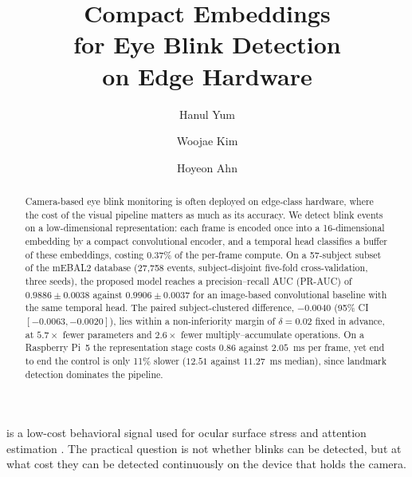 \documentclass{IEEEmce}
\begin{document}

\title{Compact Embeddings\\
for Eye Blink Detection\\
on Edge Hardware}

\author{Hanul Yum}

\author{Woojae Kim}

\author{Hoyeon Ahn}


\begin{abstract}Camera-based eye blink monitoring is often deployed on edge-class hardware, where the
cost of the visual pipeline matters as much as its accuracy. We detect blink events on a
low-dimensional representation: each frame is encoded once into a 16-dimensional
embedding by a compact convolutional encoder, and a
temporal head classifies a buffer of these embeddings,
costing 0.37\% of the per-frame compute. On a 57-subject subset of the mEBAL2 database
(27{,}758 events, subject-disjoint five-fold cross-validation, three seeds), the
proposed model reaches a precision--recall AUC (PR-AUC) of $0.9886 \pm 0.0038$ against
$0.9906 \pm 0.0037$ for an image-based convolutional baseline with the same temporal
head. The paired subject-clustered difference, $-0.0040$ (95\% CI $[-0.0063,-0.0020]$),
lies within a non-inferiority margin of $\delta = 0.02$ fixed in advance, at $5.7\times$
fewer parameters and $2.6\times$ fewer multiply--accumulate operations. On a Raspberry
Pi~5 the representation stage costs $0.86$ against $2.05$~ms per frame, yet end to end
the control is only 11\% slower ($12.51$ against $11.27$~ms median), since landmark
detection dominates the pipeline.
\end{abstract}


\maketitle
\enlargethispage{10pt}

 is a low-cost behavioral signal used for ocular surface stress
and attention estimation \cite{rosenfield2011,daza2020}. The practical question is not
whether blinks can be detected, but at what cost they can be detected continuously on
the device that holds the camera.
\end{document}
